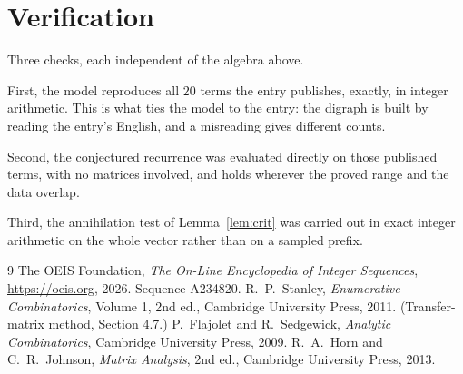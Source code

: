 \documentclass[11pt,a4paper]{article}
\theoremstyle{plain}
\theoremstyle{definition}
\begin{document}
\section{Verification}

Three checks, each independent of the algebra above.

First, the model reproduces all $20$ terms the entry publishes, exactly, in integer
arithmetic. This is what ties the model to the entry: the digraph is built by reading the
entry's English, and a misreading gives different counts.

Second, the conjectured recurrence was evaluated directly on those published terms, with no
matrices involved, and holds wherever the proved range and the data overlap.

Third, the annihilation test of Lemma~\ref{lem:crit} was carried out in exact integer
arithmetic on the whole vector rather than on a sampled prefix.

\begin{thebibliography}{9}
 The OEIS Foundation, \emph{The On-Line Encyclopedia of Integer
Sequences}, \url{https://oeis.org}, 2026. Sequence A234820.
 R.~P.~Stanley, \emph{Enumerative Combinatorics}, Volume 1, 2nd ed.,
Cambridge University Press, 2011. (Transfer-matrix method, Section 4.7.)
 P.~Flajolet and R.~Sedgewick, \emph{Analytic Combinatorics}, Cambridge
University Press, 2009.
 R.~A.~Horn and C.~R.~Johnson, \emph{Matrix Analysis}, 2nd ed., Cambridge
University Press, 2013.
\end{thebibliography}
\end{document}
